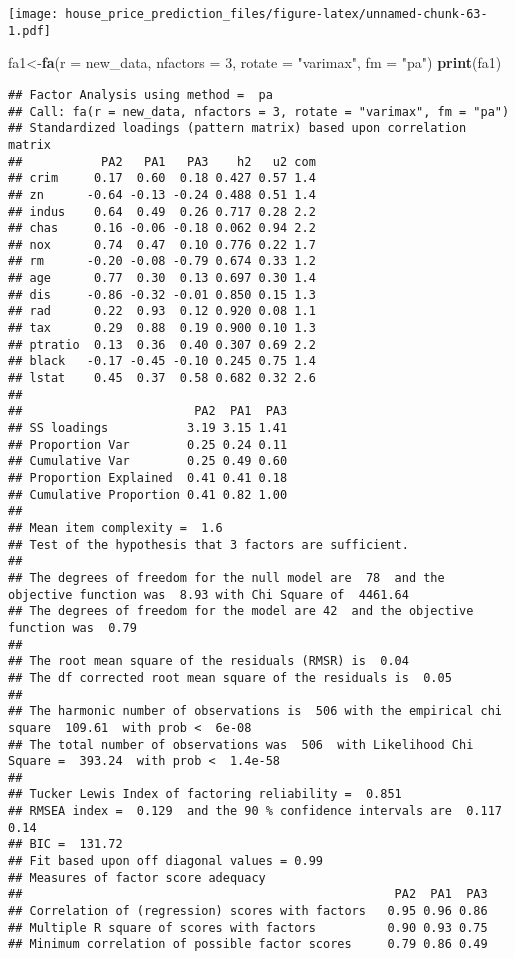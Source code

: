 \documentclass[
]{article}
\newenvironment{Shaded}{\begin{snugshade}}{\end{snugshade}}
\newcommand{\DataTypeTok}[1]{\textcolor[rgb]{0.13,0.29,0.53}{#1}}
\newcommand{\DecValTok}[1]{\textcolor[rgb]{0.00,0.00,0.81}{#1}}
\newcommand{\KeywordTok}[1]{\textcolor[rgb]{0.13,0.29,0.53}{\textbf{#1}}}
\newcommand{\NormalTok}[1]{#1}
\newcommand{\StringTok}[1]{\textcolor[rgb]{0.31,0.60,0.02}{#1}}
\begin{document}
\texttt{[image: house\_price\_prediction\_files/figure-latex/unnamed-chunk-63-1.pdf]}

\begin{Shaded}
\begin{Highlighting}[]
\NormalTok{fa1<-}\KeywordTok{fa}\NormalTok{(}\DataTypeTok{r =}\NormalTok{ new_data, }\DataTypeTok{nfactors =} \DecValTok{3}\NormalTok{, }\DataTypeTok{rotate =} \StringTok{"varimax"}\NormalTok{, }\DataTypeTok{fm =} \StringTok{"pa"}\NormalTok{)}
\KeywordTok{print}\NormalTok{(fa1)}
\end{Highlighting}
\end{Shaded}

\begin{verbatim}
## Factor Analysis using method =  pa
## Call: fa(r = new_data, nfactors = 3, rotate = "varimax", fm = "pa")
## Standardized loadings (pattern matrix) based upon correlation matrix
##           PA2   PA1   PA3    h2   u2 com
## crim     0.17  0.60  0.18 0.427 0.57 1.4
## zn      -0.64 -0.13 -0.24 0.488 0.51 1.4
## indus    0.64  0.49  0.26 0.717 0.28 2.2
## chas     0.16 -0.06 -0.18 0.062 0.94 2.2
## nox      0.74  0.47  0.10 0.776 0.22 1.7
## rm      -0.20 -0.08 -0.79 0.674 0.33 1.2
## age      0.77  0.30  0.13 0.697 0.30 1.4
## dis     -0.86 -0.32 -0.01 0.850 0.15 1.3
## rad      0.22  0.93  0.12 0.920 0.08 1.1
## tax      0.29  0.88  0.19 0.900 0.10 1.3
## ptratio  0.13  0.36  0.40 0.307 0.69 2.2
## black   -0.17 -0.45 -0.10 0.245 0.75 1.4
## lstat    0.45  0.37  0.58 0.682 0.32 2.6
## 
##                        PA2  PA1  PA3
## SS loadings           3.19 3.15 1.41
## Proportion Var        0.25 0.24 0.11
## Cumulative Var        0.25 0.49 0.60
## Proportion Explained  0.41 0.41 0.18
## Cumulative Proportion 0.41 0.82 1.00
## 
## Mean item complexity =  1.6
## Test of the hypothesis that 3 factors are sufficient.
## 
## The degrees of freedom for the null model are  78  and the objective function was  8.93 with Chi Square of  4461.64
## The degrees of freedom for the model are 42  and the objective function was  0.79 
## 
## The root mean square of the residuals (RMSR) is  0.04 
## The df corrected root mean square of the residuals is  0.05 
## 
## The harmonic number of observations is  506 with the empirical chi square  109.61  with prob <  6e-08 
## The total number of observations was  506  with Likelihood Chi Square =  393.24  with prob <  1.4e-58 
## 
## Tucker Lewis Index of factoring reliability =  0.851
## RMSEA index =  0.129  and the 90 % confidence intervals are  0.117 0.14
## BIC =  131.72
## Fit based upon off diagonal values = 0.99
## Measures of factor score adequacy             
##                                                    PA2  PA1  PA3
## Correlation of (regression) scores with factors   0.95 0.96 0.86
## Multiple R square of scores with factors          0.90 0.93 0.75
## Minimum correlation of possible factor scores     0.79 0.86 0.49
\end{verbatim}
\end{document}
